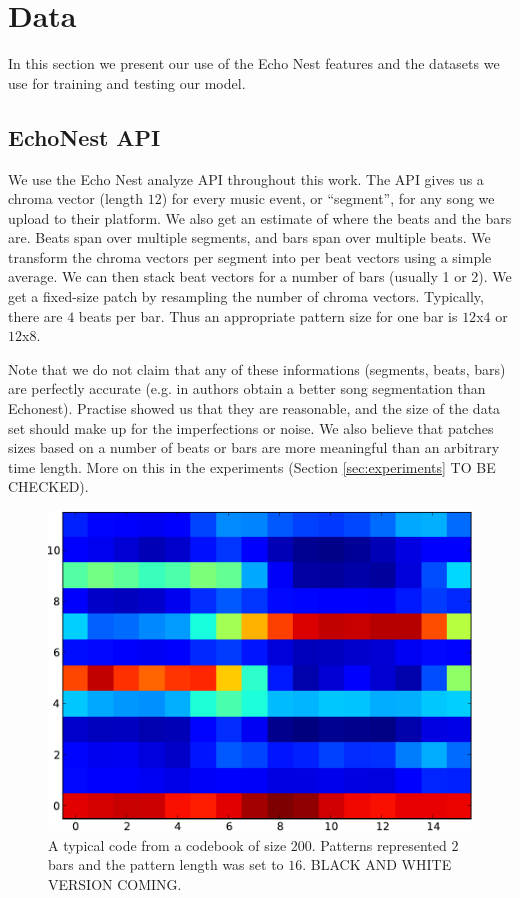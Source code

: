 \documentclass{article}
\begin{document}
\section{Data}\label{sec:data}
In this section we present our use of the Echo Nest features and the
datasets we use for training and testing our model.

\subsection{EchoNest API}
We use the Echo Nest analyze API \cite{EchoNest} throughout this work.
The API gives us a chroma vector (length $12$) for every music event, 
or ``segment'', for any song we upload to their platform. 
We also get an estimate of where the beats and the bars are. Beats span over
multiple segments, and bars span over multiple beats. 
We transform the chroma vectors per segment into per beat vectors using a 
simple average. We can then stack beat vectors for a number of bars 
(usually 1 or 2). 
We get a fixed-size patch by resampling the number of chroma vectors. Typically,
there are $4$ beats per bar. Thus an appropriate pattern size for one bar
is $12$x$4$ or $12$x$8$.

Note that we do not claim that any of these informations (segments, beats, bars)
are perfectly accurate (e.g. in \cite{Barrington2009a} authors obtain a better
song segmentation than Echonest). Practise showed us that they are reasonable, 
and the size of the data set should make up for the imperfections or noise.
We also believe that patches sizes based on a number of beats or bars are more
meaningful than an arbitrary time length. More on this in the experiments
(Section \ref{sec:experiments} TO BE CHECKED).

\begin{figure}[htb]
\begin{center}
\includegraphics[width=.8\columnwidth]{code}
\end{center}
\caption{\small{A typical code from a codebook of size $200$. 
Patterns represented
$2$ bars and the pattern length was set to $16$.
BLACK AND WHITE VERSION COMING.
}}
\label{fig:code}
\end{figure}
\end{document}
